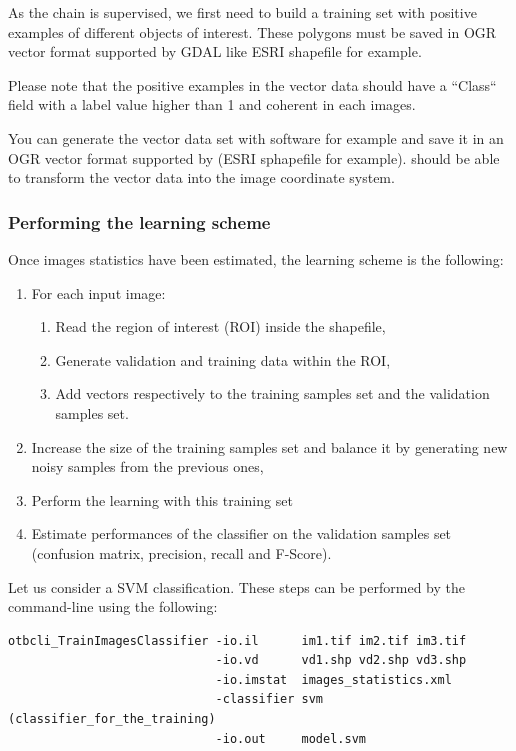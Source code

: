 As the chain is supervised, we first need to build a training set with
positive examples of different objects of interest. These polygons
must be saved in OGR vector format supported by GDAL like ESRI
shapefile for example.

Please note that the positive examples in the vector data should have a ``Class``
field with a label value higher than 1 and coherent in each images.

You can generate the vector data set with \qgis software for
example and save it in an OGR vector format supported by \gdal (ESRI
sphapefile for example). \app should be able to transform the
vector data into the image coordinate system.

\subsubsection{Performing the learning scheme}

Once images statistics have been estimated, the learning scheme is the following:
\begin{enumerate}
  \item For each input image:
  \begin{enumerate}
    \item Read the region of interest (ROI) inside the shapefile,
    \item Generate validation and training data within the ROI,
    \item Add vectors respectively to the training samples set and the validation
    samples set.
  \end{enumerate}
  \item Increase the size of the training samples set and balance it by
  generating new noisy samples from the previous ones,
  \item Perform the learning with this training set
  \item Estimate performances of the classifier on the validation samples set
  (confusion matrix, precision, recall and F-Score).
\end{enumerate}

Let us consider a SVM classification. These steps can be performed by the 
 command-line using the following:

\begin{verbatim}
otbcli_TrainImagesClassifier -io.il      im1.tif im2.tif im3.tif
                             -io.vd      vd1.shp vd2.shp vd3.shp
                             -io.imstat  images_statistics.xml
                             -classifier svm (classifier_for_the_training)
                             -io.out     model.svm
\end{verbatim}

